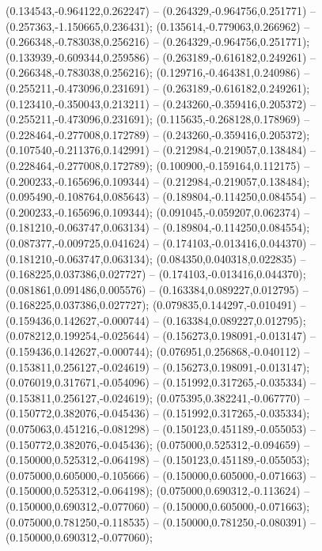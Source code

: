  (0.134543,-0.964122,0.262247) -- (0.264329,-0.964756,0.251771) -- (0.257363,-1.150665,0.236431);
 (0.135614,-0.779063,0.266962) -- (0.266348,-0.783038,0.256216) -- (0.264329,-0.964756,0.251771);
 (0.133939,-0.609344,0.259586) -- (0.263189,-0.616182,0.249261) -- (0.266348,-0.783038,0.256216);
 (0.129716,-0.464381,0.240986) -- (0.255211,-0.473096,0.231691) -- (0.263189,-0.616182,0.249261);
 (0.123410,-0.350043,0.213211) -- (0.243260,-0.359416,0.205372) -- (0.255211,-0.473096,0.231691);
 (0.115635,-0.268128,0.178969) -- (0.228464,-0.277008,0.172789) -- (0.243260,-0.359416,0.205372);
 (0.107540,-0.211376,0.142991) -- (0.212984,-0.219057,0.138484) -- (0.228464,-0.277008,0.172789);
 (0.100900,-0.159164,0.112175) -- (0.200233,-0.165696,0.109344) -- (0.212984,-0.219057,0.138484);
 (0.095490,-0.108764,0.085643) -- (0.189804,-0.114250,0.084554) -- (0.200233,-0.165696,0.109344);
 (0.091045,-0.059207,0.062374) -- (0.181210,-0.063747,0.063134) -- (0.189804,-0.114250,0.084554);
 (0.087377,-0.009725,0.041624) -- (0.174103,-0.013416,0.044370) -- (0.181210,-0.063747,0.063134);
 (0.084350,0.040318,0.022835) -- (0.168225,0.037386,0.027727) -- (0.174103,-0.013416,0.044370);
 (0.081861,0.091486,0.005576) -- (0.163384,0.089227,0.012795) -- (0.168225,0.037386,0.027727);
 (0.079835,0.144297,-0.010491) -- (0.159436,0.142627,-0.000744) -- (0.163384,0.089227,0.012795);
 (0.078212,0.199254,-0.025644) -- (0.156273,0.198091,-0.013147) -- (0.159436,0.142627,-0.000744);
 (0.076951,0.256868,-0.040112) -- (0.153811,0.256127,-0.024619) -- (0.156273,0.198091,-0.013147);
 (0.076019,0.317671,-0.054096) -- (0.151992,0.317265,-0.035334) -- (0.153811,0.256127,-0.024619);
 (0.075395,0.382241,-0.067770) -- (0.150772,0.382076,-0.045436) -- (0.151992,0.317265,-0.035334);
 (0.075063,0.451216,-0.081298) -- (0.150123,0.451189,-0.055053) -- (0.150772,0.382076,-0.045436);
 (0.075000,0.525312,-0.094659) -- (0.150000,0.525312,-0.064198) -- (0.150123,0.451189,-0.055053);
 (0.075000,0.605000,-0.105666) -- (0.150000,0.605000,-0.071663) -- (0.150000,0.525312,-0.064198);
 (0.075000,0.690312,-0.113624) -- (0.150000,0.690312,-0.077060) -- (0.150000,0.605000,-0.071663);
 (0.075000,0.781250,-0.118535) -- (0.150000,0.781250,-0.080391) -- (0.150000,0.690312,-0.077060);
